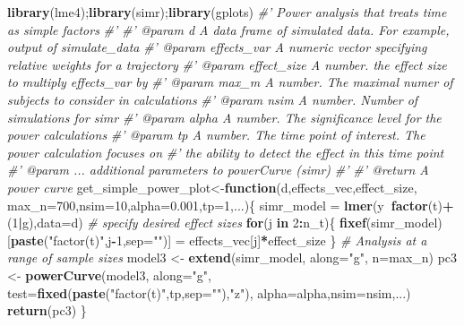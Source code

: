 \documentclass[]{article}
\newenvironment{Shaded}{\begin{snugshade}}{\end{snugshade}}
\newcommand{\KeywordTok}[1]{\textcolor[rgb]{0.13,0.29,0.53}{\textbf{#1}}}
\newcommand{\DataTypeTok}[1]{\textcolor[rgb]{0.13,0.29,0.53}{#1}}
\newcommand{\DecValTok}[1]{\textcolor[rgb]{0.00,0.00,0.81}{#1}}
\newcommand{\FloatTok}[1]{\textcolor[rgb]{0.00,0.00,0.81}{#1}}
\newcommand{\StringTok}[1]{\textcolor[rgb]{0.31,0.60,0.02}{#1}}
\newcommand{\CommentTok}[1]{\textcolor[rgb]{0.56,0.35,0.01}{\textit{#1}}}
\newcommand{\ControlFlowTok}[1]{\textcolor[rgb]{0.13,0.29,0.53}{\textbf{#1}}}
\newcommand{\OperatorTok}[1]{\textcolor[rgb]{0.81,0.36,0.00}{\textbf{#1}}}
\newcommand{\NormalTok}[1]{#1}
\begin{document}
\begin{Shaded}
\begin{Highlighting}[]
\KeywordTok{library}\NormalTok{(lme4);}\KeywordTok{library}\NormalTok{(simr);}\KeywordTok{library}\NormalTok{(gplots)}
\CommentTok{#' Power analysis that treats time as simple factors}
\CommentTok{#' }
\CommentTok{#'  @param d A data frame of simulated data. For example, output of simulate_data}
\CommentTok{#'  @param effects_var A numeric vector specifying relative weights for a trajectory}
\CommentTok{#'  @param effect_size A number. the effect size to multiply effects_var by}
\CommentTok{#'  @param max_m A number.  The maximal numer of subjects to consider in calculations}
\CommentTok{#'  @param nsim A number. Number of simulations for simr}
\CommentTok{#'  @param alpha A number. The significance level for the power calculations}
\CommentTok{#'  @param tp A number. The time point of interest. The power calculation focuses on }
\CommentTok{#'  the ability to detect the effect in this time point}
\CommentTok{#'  @param ... additional parameters to powerCurve (simr)}
\CommentTok{#'  }
\CommentTok{#'  @return A power curve}
\NormalTok{get_simple_power_plot<-}\ControlFlowTok{function}\NormalTok{(d,effects_vec,effect_size,}
                                \DataTypeTok{max_n=}\DecValTok{700}\NormalTok{,}\DataTypeTok{nsim=}\DecValTok{10}\NormalTok{,}\DataTypeTok{alpha=}\FloatTok{0.001}\NormalTok{,}\DataTypeTok{tp=}\DecValTok{1}\NormalTok{,...)\{}
\NormalTok{  simr_model =}\StringTok{ }\KeywordTok{lmer}\NormalTok{(y}\OperatorTok{~}\KeywordTok{factor}\NormalTok{(t)}\OperatorTok{+}\NormalTok{(}\DecValTok{1}\OperatorTok{|}\NormalTok{g),}\DataTypeTok{data=}\NormalTok{d)}
  \CommentTok{# specify desired effect sizes}
  \ControlFlowTok{for}\NormalTok{(j }\ControlFlowTok{in} \DecValTok{2}\OperatorTok{:}\NormalTok{n_t)\{}
    \KeywordTok{fixef}\NormalTok{(simr_model)[}\KeywordTok{paste}\NormalTok{(}\StringTok{"factor(t)"}\NormalTok{,j}\OperatorTok{-}\DecValTok{1}\NormalTok{,}\DataTypeTok{sep=}\StringTok{""}\NormalTok{)] =}\StringTok{ }\NormalTok{effects_vec[j]}\OperatorTok{*}\NormalTok{effect_size}
\NormalTok{  \}}
  \CommentTok{# Analysis at a range of sample sizes}
\NormalTok{  model3 <-}\StringTok{ }\KeywordTok{extend}\NormalTok{(simr_model, }\DataTypeTok{along=}\StringTok{"g"}\NormalTok{, }\DataTypeTok{n=}\NormalTok{max_n)}
\NormalTok{  pc3 <-}\StringTok{ }\KeywordTok{powerCurve}\NormalTok{(model3, }\DataTypeTok{along=}\StringTok{"g"}\NormalTok{,}
                    \DataTypeTok{test=}\KeywordTok{fixed}\NormalTok{(}\KeywordTok{paste}\NormalTok{(}\StringTok{"factor(t)"}\NormalTok{,tp,}\DataTypeTok{sep=}\StringTok{""}\NormalTok{),}\StringTok{"z"}\NormalTok{),}
                    \DataTypeTok{alpha=}\NormalTok{alpha,}\DataTypeTok{nsim=}\NormalTok{nsim,...)}
  \KeywordTok{return}\NormalTok{(pc3)}
\NormalTok{\}}


\end{Highlighting}
\end{Shaded}
\end{document}

